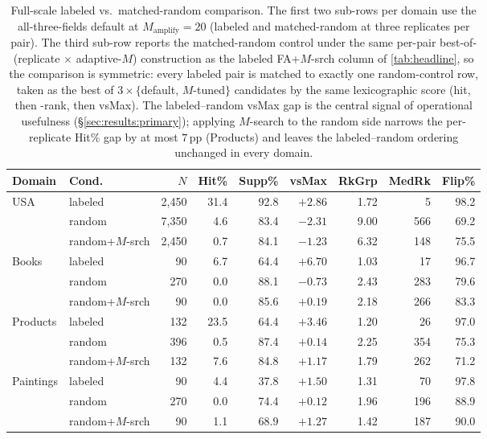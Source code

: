 \begin{table}[h]
\centering\small
\begin{tabular}{llrrrrrrr}
\toprule
Domain & Cond.\ & $N$ & Hit\% & Supp\% & vsMax & RkGrp & MedRk & Flip\% \\
\midrule
USA       & labeled         & 2{,}450 & 31.4 & 92.8 & $+2.86$ & 1.72 & 5   & 98.2 \\
          & random          & 7{,}350 &  4.6 & 83.4 & $-2.31$ & 9.00 & 566 & 69.2 \\
          & random+$M$-srch & 2{,}450 &  0.7 & 84.1 & $-1.23$ & 6.32 & 148 & 75.5 \\
Books     & labeled         &    90   &  6.7 & 64.4 & $+6.70$ & 1.03 & 17  & 96.7 \\
          & random          &   270   &  0.0 & 88.1 & $-0.73$ & 2.43 & 283 & 79.6 \\
          & random+$M$-srch &    90   &  0.0 & 85.6 & $+0.19$ & 2.18 & 266 & 83.3 \\
Products  & labeled         &   132   & 23.5 & 64.4 & $+3.46$ & 1.20 & 26  & 97.0 \\
          & random          &   396   &  0.5 & 87.4 & $+0.14$ & 2.25 & 354 & 75.3 \\
          & random+$M$-srch &   132   &  7.6 & 84.8 & $+1.17$ & 1.79 & 262 & 71.2 \\
Paintings & labeled         &    90   &  4.4 & 37.8 & $+1.50$ & 1.31 & 70  & 97.8 \\
          & random          &   270   &  0.0 & 74.4 & $+0.12$ & 1.96 & 196 & 88.9 \\
          & random+$M$-srch &    90   &  1.1 & 68.9 & $+1.27$ & 1.42 & 187 & 90.0 \\
\bottomrule
\end{tabular}
\caption{Full-scale labeled vs.\ matched-random comparison. The first two sub-rows per domain use the all-three-fields default at $M_{\mathrm{amplify}}{=}20$ (labeled and matched-random at three replicates per pair). The third sub-row reports the matched-random control under the same per-pair best-of-(replicate $\times$ adaptive-$M$) construction as the labeled FA+$M$-srch column of \cref{tab:headline}, so the comparison is symmetric: every labeled pair is matched to exactly one random-control row, taken as the best of $3 \times \{$default, $M$-tuned$\}$ candidates by the same lexicographic score (hit, then -rank, then vsMax). The labeled--random vsMax gap is the central signal of operational usefulness (\S\ref{sec:results:primary}); applying $M$-search to the random side narrows the per-replicate Hit\% gap by at most $7$\,pp (Products) and leaves the labeled--random ordering unchanged in every domain.}
\label{tab:fullscale-spec}
\end{table}

